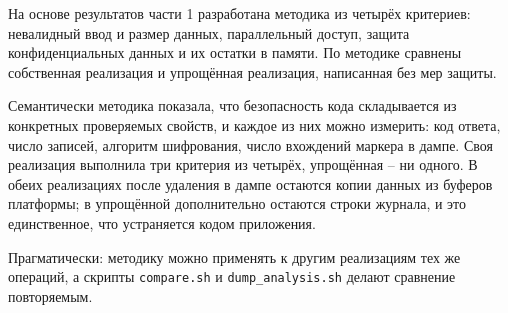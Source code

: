 \newpage
{}

На основе результатов части 1 разработана методика из четырёх
критериев: невалидный ввод и размер данных, параллельный доступ, защита
конфиденциальных данных и их остатки в памяти. По методике сравнены
собственная реализация и упрощённая реализация, написанная без мер
защиты.

Семантически методика показала, что безопасность кода складывается из
конкретных проверяемых свойств, и каждое из них можно измерить: код
ответа, число записей, алгоритм шифрования, число вхождений маркера в
дампе. Своя реализация выполнила три критерия из четырёх, упрощённая --
ни одного. В обеих реализациях после удаления в дампе остаются копии
данных из буферов платформы; в упрощённой дополнительно остаются строки
журнала, и это единственное, что устраняется кодом приложения.

Прагматически: методику можно применять к другим реализациям тех же
операций, а скрипты \texttt{compare.sh} и \texttt{dump\_analysis.sh}
делают сравнение повторяемым.

